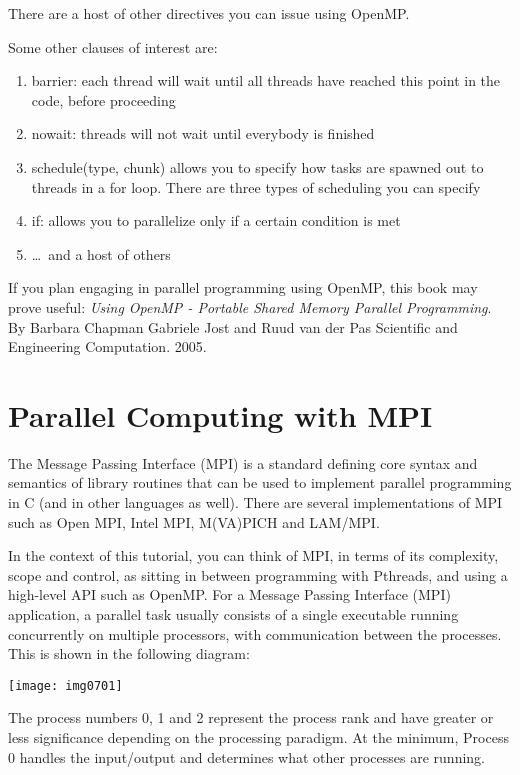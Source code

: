 There are a host of other directives you can issue using OpenMP.

Some other clauses of interest are:

\begin{enumerate}
\item  barrier: each thread will wait until all threads have reached this point in the code, before proceeding
\item  nowait: threads will not wait until everybody is finished
\item  schedule(type, chunk) allows you to specify how tasks are spawned out to threads in a for loop. There are three types of scheduling you can specify
\item  if: allows you to parallelize only if a certain condition is met
\item  \dots\  and a host of others
\end{enumerate}

\begin{tip}
If you plan engaging in parallel programming using OpenMP, this
book may prove useful: \textit{Using OpenMP - Portable Shared Memory Parallel
Programming}. By Barbara Chapman Gabriele Jost and Ruud van der Pas Scientific
and Engineering Computation. 2005.
\end{tip}

\section{Parallel Computing with MPI}

The Message Passing Interface (MPI) is a standard defining core syntax and
semantics of library routines that can be used to implement parallel
programming in C (and in other languages as well). There are several
implementations of MPI such as Open MPI, Intel MPI, M(VA)PICH and LAM/MPI.

In the context of this tutorial, you can think of MPI, in terms of its
complexity, scope and control, as sitting in between programming with Pthreads,
and using a high-level API such as OpenMP. For a Message Passing Interface
(MPI) application, a parallel task usually consists of a single executable
running concurrently on multiple processors, with communication between the
processes.  This is shown in the following diagram:

\texttt{[image: img0701]}

The process numbers 0, 1 and 2 represent the process rank and have greater or
less significance depending on the processing paradigm. At the minimum, Process
0 handles the input/output and determines what other processes are running.

